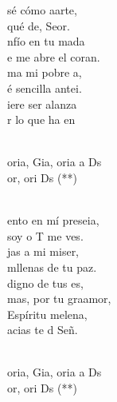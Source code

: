 \documentclass[12pt]{article}
\begin{document}
\begin{multicols*}{2}
\begin{cancion}%
	 sé cómo aarte, \\
	 qué de, Seor.\\
	nfío en tu mada \\
	e me abre el coran.\\
	ma mi pobre a, \\
	é sencilla antei.\\
	iere ser alanza\\
	r lo que ha en  \\\jump\\
	\begin{chorus}%
	oria, Gia, oria a Ds\\
	or, ori Ds (**)\\
	\end{chorus}%
	\jump\\
	ento en mí preseia,\\
	soy o T me ves.\\
	jas a mi miser, \\
	mllenas de tu paz.\\
	digno de tus es, \\
	mas, por tu graamor,\\
	 Espíritu melena, \\
	acias te d Señ. \\\jump\\
	\begin{chorus}%
	oria, Gia, oria a Ds\\
	or, ori Ds (**)\\
	\end{chorus}%
	\jump\\

\end{cancion}
\end{multicols*}
\end{document}
